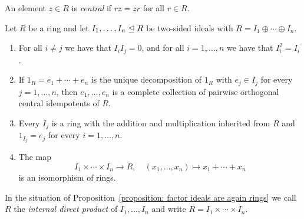 \begin{definition}
  An element $z \in R$ is \emph{central} if $rz = zr$ for all $r \in R$.
\end{definition}


\begin{proposition}
  \label{proposition: factor ideals are again rings}
  Let $R$ be a ring and let $I_1, \dotsc, I_n \trianglelefteq R$ be two-sided ideals with $R = I_1 \oplus \dotsb \oplus I_n$.
  \begin{enumerate}
    \item
      For all $i \neq j$ we have that $I_i I_j = 0$, and for all $i = 1, \dotsc, n$ we have that $I_i^2 = I_i$.
    \item
      If $1_R = e_1 + \dotsb + e_n$ is the unique decomposition of $1_R$ with $e_j \in I_j$ for every $j = 1, \dotsc, n$, then $e_1, \dotsc, e_n$ is a complete collection of pairwise orthogonal central idempotents of $R$. 
    \item
      Every $I_j$ is a ring with the addition and multiplication inherited from $R$ and $1_{I_j} = e_j$ for every $i = 1, \dotsc, n$.
    \item
      The map
      \[
            I_1 \times \dotsb \times I_n
        \to R,
        \quad   (x_1, \dotsc, x_n)
        \mapsto x_1 + \dotsb + x_n
      \]
      is an isomorphism of rings.
  \end{enumerate}
\end{proposition}




\begin{definition}
  \label{definition: internal direct product of rings}
  In the situation of Proposition~\ref{proposition: factor ideals are again rings} we call $R$ the \emph{internal direct product} of $I_1, \dotsc, I_n$ and write $R = I_1 \times \dotsb \times I_n$.
\end{definition}


